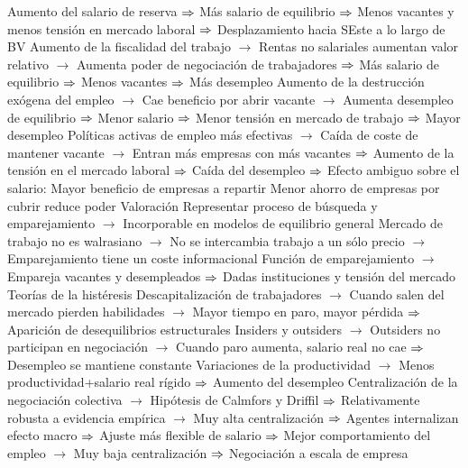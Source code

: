 \documentclass{nuevotema}
\begin{document}
\begin{esquemal}
				\4 Aumento del salario de reserva
				\4[] $\Rightarrow$ Más salario de equilibrio
				\4[] $\Rightarrow$ Menos vacantes y menos tensión en mercado laboral
				\4[] $\Rightarrow$ Desplazamiento hacia SEste a lo largo de BV
				\4 Aumento de la fiscalidad del trabajo
				\4[] $\to$ Rentas no salariales aumentan valor relativo
				\4[] $\to$ Aumenta poder de negociación de trabajadores
				\4[] $\Rightarrow$ Más salario de equilibrio
				\4[] $\Rightarrow$ Menos vacantes
				\4[] $\Rightarrow$ Más desempleo
				\4 Aumento de la destrucción exógena del empleo
				\4[] $\to$ Cae beneficio por abrir vacante
				\4[] $\to$ Aumenta desempleo de equilibrio
				\4[] $\Rightarrow$ Menor salario
				\4[] $\Rightarrow$ Menor tensión en mercado de trabajo
				\4[] $\Rightarrow$ Mayor desempleo
				\4 Políticas activas de empleo más efectivas
				\4[] $\to$ Caída de coste de mantener vacante
				\4[] $\to$ Entran más empresas con más vacantes
				\4[] $\Rightarrow$ Aumento de la tensión en el mercado laboral
				\4[] $\Rightarrow$ Caída del desempleo
				\4[] $\Rightarrow$ Efecto ambiguo sobre el salario:
				\4[] \quad Mayor beneficio de empresas a repartir
				\4[] \quad Menor ahorro de empresas por cubrir reduce poder
			\3 Valoración
				\4[] Representar proceso de búsqueda y emparejamiento
				\4[] $\to$ Incorporable en modelos de equilibrio general
				\4[] Mercado de trabajo no es walrasiano
				\4[] $\to$ No se intercambia trabajo a un sólo precio
				\4[] $\to$ Emparejamiento tiene un coste informacional
				\4[] Función de emparejamiento
				\4[] $\to$ Empareja vacantes y desempleados
				\4[] $\Rightarrow$ Dadas instituciones y tensión del mercado
				\4 Teorías de la histéresis
				\4[] Descapitalización de trabajadores
				\4[] $\to$ Cuando salen del mercado pierden habilidades
				\4[] $\to$ Mayor tiempo en paro, mayor pérdida
				\4[] $\Rightarrow$ Aparición de desequilibrios estructurales
				\4[] Insiders y outsiders
				\4[] $\to$ Outsiders no participan en negociación
				\4[] $\to$ Cuando paro aumenta, salario real no cae
				\4[] $\Rightarrow$ Desempleo se mantiene constante
				\4[] Variaciones de la productividad
				\4[] $\to$ Menos productividad+salario real rígido
				\4[] $\Rightarrow$ Aumento del desempleo
				\4[] Centralización de la negociación colectiva
				\4[] $\to$ Hipótesis de Calmfors y Driffil
				\4[] $\Rightarrow$ Relativamente robusta a evidencia empírica
				\4[] $\to$ Muy alta centralización
				\4[] $\Rightarrow$ Agentes internalizan efecto macro
				\4[] $\Rightarrow$ Ajuste más flexible de salario
				\4[] $\Rightarrow$ Mejor comportamiento del empleo
				\4[] $\to$ Muy baja centralización
				\4[] $\Rightarrow$ Negociación a escala de empresa

\end{esquemal}
\end{document}
